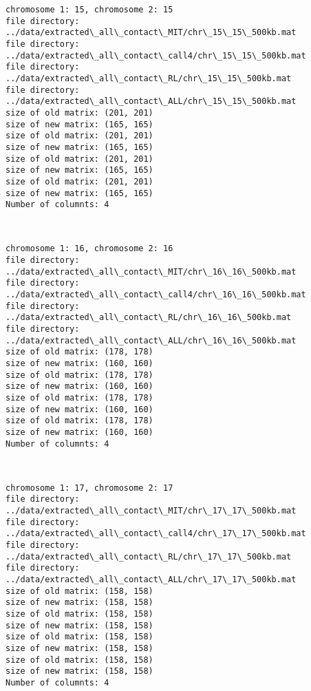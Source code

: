 \documentclass[11pt]{article}
\begin{document}
    \begin{Verbatim}[commandchars=\\\{\}]
chromosome 1: 15, chromosome 2: 15
file directory: ../data/extracted\_all\_contact\_MIT/chr\_15\_15\_500kb.mat
file directory: ../data/extracted\_all\_contact\_call4/chr\_15\_15\_500kb.mat
file directory: ../data/extracted\_all\_contact\_RL/chr\_15\_15\_500kb.mat
file directory: ../data/extracted\_all\_contact\_ALL/chr\_15\_15\_500kb.mat
size of old matrix: (201, 201)
size of new matrix: (165, 165)
size of old matrix: (201, 201)
size of new matrix: (165, 165)
size of old matrix: (201, 201)
size of new matrix: (165, 165)
size of old matrix: (201, 201)
size of new matrix: (165, 165)
Number of columnts: 4

    \end{Verbatim}

    \begin{center}
    \end{center}
    { \hspace*{\fill} \\}
    
    \begin{Verbatim}[commandchars=\\\{\}]
chromosome 1: 16, chromosome 2: 16
file directory: ../data/extracted\_all\_contact\_MIT/chr\_16\_16\_500kb.mat
file directory: ../data/extracted\_all\_contact\_call4/chr\_16\_16\_500kb.mat
file directory: ../data/extracted\_all\_contact\_RL/chr\_16\_16\_500kb.mat
file directory: ../data/extracted\_all\_contact\_ALL/chr\_16\_16\_500kb.mat
size of old matrix: (178, 178)
size of new matrix: (160, 160)
size of old matrix: (178, 178)
size of new matrix: (160, 160)
size of old matrix: (178, 178)
size of new matrix: (160, 160)
size of old matrix: (178, 178)
size of new matrix: (160, 160)
Number of columnts: 4

    \end{Verbatim}

    \begin{center}
    \end{center}
    { \hspace*{\fill} \\}
    
    \begin{Verbatim}[commandchars=\\\{\}]
chromosome 1: 17, chromosome 2: 17
file directory: ../data/extracted\_all\_contact\_MIT/chr\_17\_17\_500kb.mat
file directory: ../data/extracted\_all\_contact\_call4/chr\_17\_17\_500kb.mat
file directory: ../data/extracted\_all\_contact\_RL/chr\_17\_17\_500kb.mat
file directory: ../data/extracted\_all\_contact\_ALL/chr\_17\_17\_500kb.mat
size of old matrix: (158, 158)
size of new matrix: (158, 158)
size of old matrix: (158, 158)
size of new matrix: (158, 158)
size of old matrix: (158, 158)
size of new matrix: (158, 158)
size of old matrix: (158, 158)
size of new matrix: (158, 158)
Number of columnts: 4

    \end{Verbatim}
\end{document}
